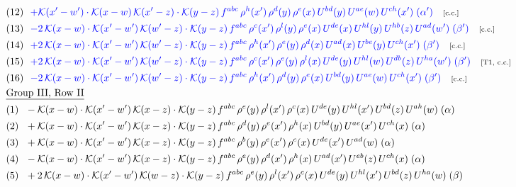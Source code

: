 \documentclass[9pt]{article}
\begin{document}
\begin{align}
&\quad\text{(12)}\ \ \textcolor{blue}{+\mathcal{K}(x'-w')\cdot\mathcal{K}(x-w)\,\mathcal{K}(x'-z)\cdot\mathcal{K}(y-z)\, f^{abc}\,\rho^{h}(x')\,\rho^{d}(y)\,\rho^{e}(x)\,U^{bd}(y)\,U^{ae}(w)\,U^{ch}(x')\;(\alpha')}\quad\text{\scriptsize[c.c.]}\notag\\
&\quad\text{(13)}\ \ \textcolor{blue}{-2\,\mathcal{K}(x-w)\cdot\mathcal{K}(x'-w')\,\mathcal{K}(w'-z)\cdot\mathcal{K}(y-z)\, f^{abc}\,\rho^{c}(x')\,\rho^{l}(y)\,\rho^{e}(x)\,U^{de}(x)\,U^{hl}(y)\,U^{hb}(z)\,U^{ad}(w')\;(\beta')}\quad\text{\scriptsize[c.c.]}\notag\\
&\quad\text{(14)}\ \ \textcolor{blue}{+2\,\mathcal{K}(x-w)\cdot\mathcal{K}(x'-w')\,\mathcal{K}(w'-z)\cdot\mathcal{K}(y-z)\, f^{abc}\,\rho^{h}(x')\,\rho^{e}(y)\,\rho^{d}(x)\,U^{ad}(x)\,U^{be}(y)\,U^{ch}(x')\;(\beta')}\quad\text{\scriptsize[c.c.]}\notag\\
&\quad\text{(15)}\ \ \textcolor{blue}{+2\,\mathcal{K}(x-w)\cdot\mathcal{K}(x'-w')\,\mathcal{K}(w'-z)\cdot\mathcal{K}(y-z)\, f^{abc}\,\rho^{c}(x')\,\rho^{e}(y)\,\rho^{l}(x)\,U^{de}(y)\,U^{hl}(w)\,U^{db}(z)\,U^{ha}(w')\;(\beta')}\quad\text{\scriptsize[T1, c.c.]}\notag\\
&\quad\text{(16)}\ \ \textcolor{blue}{-2\,\mathcal{K}(x-w)\cdot\mathcal{K}(x'-w')\,\mathcal{K}(w'-z)\cdot\mathcal{K}(y-z)\, f^{abc}\,\rho^{h}(x')\,\rho^{d}(y)\,\rho^{e}(x)\,U^{bd}(y)\,U^{ae}(w)\,U^{ch}(x')\;(\beta')}\quad\text{\scriptsize[c.c.]}\notag\\
&\quad\underline{\text{Group III, Row II}}\notag\\
&\quad\text{(1)}\ \ -\mathcal{K}(x-w)\cdot \mathcal{K}(x'-w')\, \mathcal{K}(x-z)\cdot \mathcal{K}(y-z)\, f^{abc}\, \rho^{e}(y)\,\rho^{l}(x')\,\rho^{c}(x)\,U^{de}(y)\,U^{hl}(x')\,U^{bd}(z)\,U^{ah}(w)\;(\alpha)\notag\\
&\quad\text{(2)}\ \ +\mathcal{K}(x-w)\cdot \mathcal{K}(x'-w')\, \mathcal{K}(x-z)\cdot \mathcal{K}(y-z)\, f^{abc}\, \rho^{d}(y)\,\rho^{e}(x')\,\rho^{h}(x)\,U^{bd}(y)\,U^{ae}(x')\,U^{ch}(x)\;(\alpha)\notag\\
&\quad\text{(3)}\ \ + \mathcal{K}(x-w)\cdot \mathcal{K}(x'-w')\, \mathcal{K}(x-z)\cdot \mathcal{K}(y-z)\, f^{abc}\, \rho^{b}(y)\,\rho^{e}(x')\,\rho^{c}(x)\,U^{de}(x')\,U^{ad}(w)\;(\alpha)\notag\\
&\quad\text{(4)}\ \ -\mathcal{K}(x-w)\cdot \mathcal{K}(x'-w')\, \mathcal{K}(x-z)\cdot \mathcal{K}(y-z)\, f^{abc}\, \rho^{e}(y)\,\rho^{d}(x')\,\rho^{h}(x)\,U^{ad}(x')\,U^{eb}(z)\,U^{ch}(x)\;(\alpha)\notag\\
&\quad\text{(5)}\ \ +2\, \mathcal{K}(x-w)\cdot \mathcal{K}(x'-w')\, \mathcal{K}(w-z) \cdot \mathcal{K}(y-z)\, f^{abc}\, \rho^{e}(y)\,\rho^{l}(x')\, \rho^{c}(x)\, U^{de}(y)\,U^{hl}(x')\,U^{bd}(z)\,U^{ha}(w)\;(\beta)\notag\\

\end{align}
\end{document}
